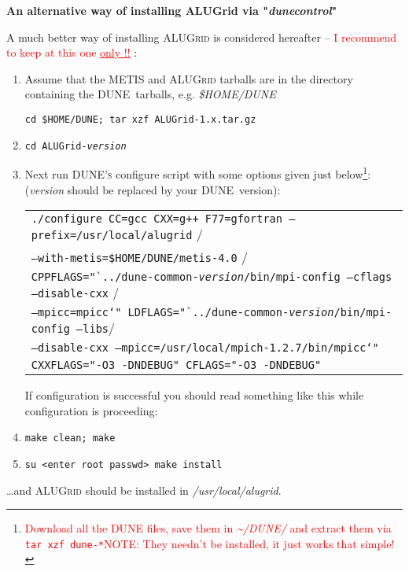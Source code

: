 \documentclass[a4paper,12pt]{article}
\newcommand{\dune}{\textsc{DUNE}\ }
\newcommand{\dyeitred}{\textcolor{red}}{}
\begin{document}
\begin{center}
 \large {\textbf{\textsf{An alternative way of installing ALUGrid via "\textit{dunecontrol}"}}}
\end{center}
A much better way of installing \textsc{ALUGrid} is considered hereafter -- \dyeitred{I
recommend to keep at  this one \underline{\underline{{only !!}}}} :
\begin{enumerate}
\item Assume that the \textsc{METIS} and \textsc{ALUGrid} tarballs are in the
directory containing the \dune tarballs, e.g. \textit{\$HOME/DUNE}
  \begin{center}
    \texttt{cd \$HOME/DUNE; tar xzf ALUGrid-1.x.tar.gz}  
    \end{center}
  \item \texttt{cd ALUGrid-\textit{version}}
  \item Next run \textsc{DUNE's} configure script with some options given just below\footnote{\dyeitred{Download all the \textsc{DUNE} files, save them in \textit{\textasciitilde/DUNE/} and extract them via \texttt{tar xzf dune-*}\newline NOTE: They needn't be installed, it just works that simple!}}:
    (\textit{version} should be replaced by your \dune version): \begin{center}\begin{tabular}{l}
    \texttt{./configure CC=gcc CXX=g++ F77=gfortran
      --prefix=/usr/local/alugrid} /\\ 
    \texttt{--with-metis=\$HOME/DUNE/metis-4.0} / \\
      \texttt{CPPFLAGS="`../dune-common-\textit{version}/bin/mpi-config --cflags
      --disable-cxx} /\\
    \texttt{--mpicc=mpicc`"
      LDFLAGS="`../dune-common-\textit{version}/bin/mpi-config --libs}/ \\
  \texttt{--disable-cxx --mpicc=/usr/local/mpich-1.2.7/bin/mpicc`"  }\\
  \texttt{CXXFLAGS="-O3 -DNDEBUG" CFLAGS="-O3 -DNDEBUG"}
    \end{tabular}
    \end{center}
    If configuration is successful you should read something like this while configuration is proceeding:
    

\item \texttt{make clean; make}
   \item \texttt{su <enter root passwd>  make install}
\end{enumerate}
\ldots and \textsc{ALUGrid} should be installed in \textit{/usr/local/alugrid}.
\end{document}
